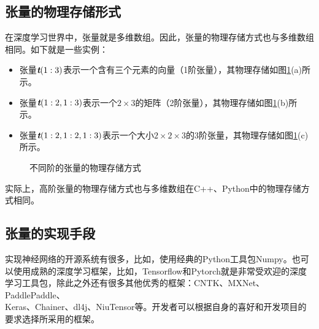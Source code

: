 \subsection{张量的物理存储形式}

\parinterval 在深度学习世界中，张量就是多维数组。因此，张量的物理存储方式也与多维数组相同。如下就是一些实例：

\begin{itemize}
\vspace{0.5em}
\item 张量$ {\textbf{\em t}}(1:3) $表示一个含有三个元素的向量（1阶张量），其物理存储如图\ref{fig:9-29}(a)所示。
\vspace{0.5em}
\item 张量$ {\textbf{\em t}}(1:2,1:3) $表示一个$ 2\times 3 $的矩阵（2阶张量），其物理存储如图\ref{fig:9-29}(b)所示。
\vspace{0.5em}
\item 张量${\textbf{\em t}}(1:2,1:2,1:3) $表示一个大小$ 2\times 2\times 3 $的3阶张量，其物理存储如图\ref{fig:9-29}(c)所示。
\vspace{0.5em}
\end{itemize}

\begin{figure}[htp]
\centering

\caption{不同阶的张量的物理存储方式}
\label{fig:9-29}
\end{figure}

\parinterval 实际上，高阶张量的物理存储方式也与多维数组在C++、Python中的物理存储方式相同。\\


\subsection{张量的实现手段}

\parinterval 实现神经网络的开源系统有很多，比如，使用经典的Python工具包Numpy。也可以使用成熟的深度学习框架，比如，Tensorflow和Pytorch就是非常受欢迎的深度学习工具包，除此之外还有很多其他优秀的框架：CNTK、MXNet、PaddlePaddle、\\Keras、Chainer、dl4j、NiuTensor等。开发者可以根据自身的喜好和开发项目的要求选择所采用的框架。


